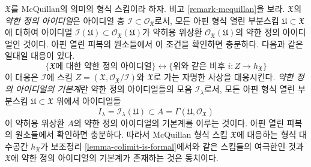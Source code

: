 \begin{remark}[약한 정의 아이디얼]
\label{remark-weak-ideals-of-definition}
$\mathfrak X$를 McQuillan의 의미의 형식 스킴이라 하자. 비고
\ref{remark-mcquillan}을 보라. $\mathfrak X$의
{\it 약한 정의 아이디얼}은 아이디얼 층
$\mathcal{I} \subset \mathcal{O}_\mathfrak X$로서, 모든 아핀 형식
열린 부분스킴 $\mathfrak U \subset \mathfrak X$에 대하여 아이디얼
$\mathcal{I}(\mathfrak U) \subset \mathcal{O}_\mathfrak X(\mathfrak U)$가
약허용 위상환 $\mathcal{O}_\mathfrak X(\mathfrak U)$의 약한 정의
아이디얼인 것이다. 아핀 열린 피복의 원소들에서 이 조건을 확인하면
충분하다. 다음과 같은 일대일 대응이 있다.
$$
\{\mathfrak X\text{에 대한 약한 정의 아이디얼}\}
\leftrightarrow
\{\text{위와 같은 비후 }i : Z \to h_\mathfrak X\}
$$
이 대응은 $\mathcal{I}$에 스킴
$Z = (\mathfrak X, \mathcal{O}_\mathfrak X/\mathcal{I})$와
$\mathfrak X$로 가는 자명한 사상을 대응시킨다.
{\it 약한 정의 아이디얼의 기본계}란 약한 정의 아이디얼들의 모음
$\mathcal{I}_\lambda$로서, 모든 아핀 형식 열린 부분스킴
$\mathfrak U \subset \mathfrak X$ 위에서 아이디얼들
$$
I_\lambda = \mathcal{I}_\lambda(\mathfrak U) \subset
A = \Gamma(\mathfrak U, \mathcal{O}_\mathfrak X)
$$
이 약허용 위상환 $A$의 약한 정의 아이디얼의 기본계를 이루는
것이다. 아핀 열린 피복의 원소들에서 확인하면 충분하다. 따라서
McQuillan 형식 스킴 $\mathfrak X$에 대응하는 형식 대수공간
$h_\mathfrak X$가 보조정리 \ref{lemma-colimit-is-formal}에서와
같은 스킴들의 여극한인 것과 $\mathfrak X$에 약한 정의 아이디얼의
기본계가 존재하는 것은 동치이다.
\end{remark}

